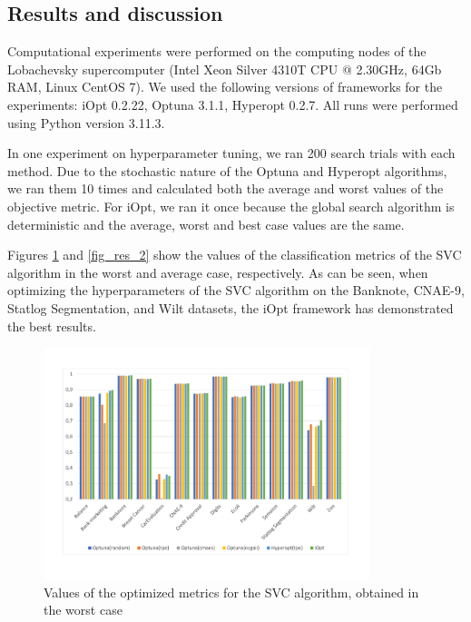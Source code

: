 \documentclass[preprint,12pt]{elsarticle}
\begin{document}
\subsection{Results and discussion}

Computational experiments were performed on the computing nodes of the Lobachevsky supercomputer (Intel Xeon Silver 4310T CPU @ 2.30GHz, 64Gb RAM, Linux CentOS 7). We used the following versions of frameworks for the experiments: iOpt 0.2.22, Optuna 3.1.1, Hyperopt 0.2.7. All runs were performed using Python version 3.11.3.

In one experiment on hyperparameter tuning, we ran 200 search trials with each method. Due to the stochastic nature of the Optuna and Hyperopt algorithms, we ran them 10 times and calculated both the average and worst values of the objective  metric. For iOpt, we ran it once because the global search algorithm is deterministic and the average, worst and best case values are the same.

Figures \ref{fig_res_1} and \ref{fig_res_2} show the values of the classification metrics of the SVC algorithm in the worst and average case, respectively. As can be seen, when optimizing the hyperparameters of the SVC algorithm on the Banknote, CNAE-9, Statlog Segmentation, and Wilt datasets, the iOpt framework has demonstrated the best results.

\begin{figure}
\centering
\includegraphics[width=0.85\textwidth]{SVC_1.pdf}
\caption{Values of the optimized metrics for the SVC algorithm, obtained in the worst case} \label{fig_res_1}
\end{figure}
\end{document}
